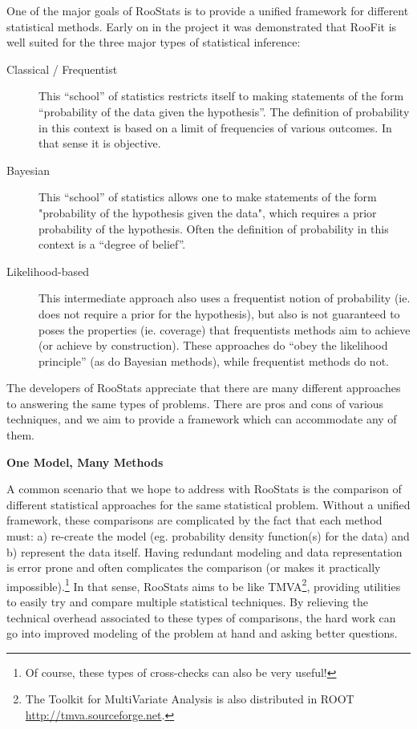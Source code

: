 \documentclass[11pt]{article}
\begin{document}
One of the major goals of RooStats is to provide a unified framework for different statistical methods.  Early on in the project it was demonstrated that RooFit is well suited for the three major types of statistical inference:
\begin{description}
 \item[Classical / Frequentist] This ``school'' of statistics restricts itself to making statements of the form ``probability of the data given the hypothesis''.  The definition of probability in this context is based on a limit of frequencies of various outcomes.  In that sense it is objective.
 \item[Bayesian] This ``school'' of statistics allows one to make statements of the form "probability of the hypothesis given the data", which requires a prior probability of the hypothesis.  Often the definition of probability in this context is a ``degree of belief''.  
 \item[Likelihood-based] This intermediate approach also uses a frequentist notion of probability (ie. does not require a prior for the hypothesis), but also is not guaranteed to poses the properties (ie. coverage) that frequentists methods aim to achieve (or achieve by construction).  These approaches do ``obey the likelihood principle'' (as do Bayesian methods), while frequentist methods do not. 
\end{description}
The developers of RooStats appreciate that there are many different approaches to answering the same types of problems.  There are pros and cons of various techniques, and we aim to provide a framework which can accommodate any of them.

{\flushleft \textbf{One Model, Many Methods}}

A common scenario that we hope to address with RooStats is the comparison of different statistical approaches for the same statistical problem.  Without a unified framework, these comparisons are complicated by the fact that each method must: a) re-create the model (eg. probability density function(s) for the data) and b) represent the data itself.  Having redundant modeling and data representation is error prone and often complicates the comparison (or makes it practically impossible).\footnote{Of course, these types of cross-checks can also be very useful! }  In that sense, RooStats aims to be like TMVA\footnote{The Toolkit for MultiVariate Analysis is also distributed in ROOT \url{http://tmva.sourceforge.net}.}, providing utilities to easily try and compare multiple statistical techniques.  By relieving the technical overhead associated to these types of comparisons, the hard work can go into improved modeling of the problem at hand and asking better questions.
\newpage
\end{document}
